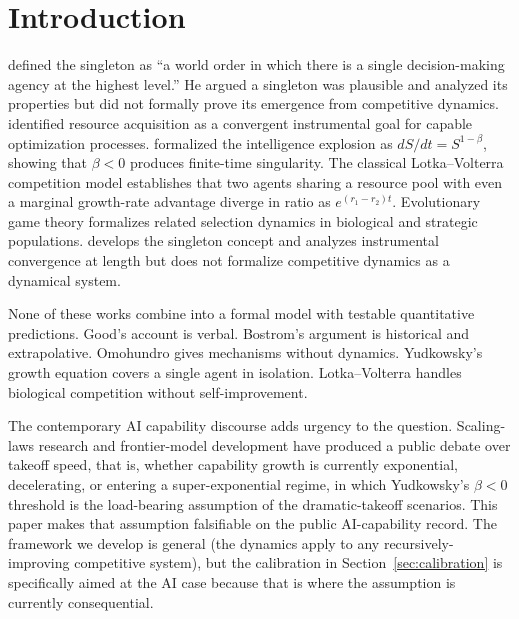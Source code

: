 \documentclass[11pt,letterpaper]{article}
\theoremstyle{plain}
\theoremstyle{definition}
\theoremstyle{remark}
\begin{document}
\section{Introduction}
\label{sec:intro}

\citet{bostrom2005singleton} defined the singleton as ``a world order in which
there is a single decision-making agency at the highest level.''
He argued a singleton was plausible and analyzed its properties but did not
formally prove its emergence from competitive dynamics.
\citet{omohundro2008basic} identified resource acquisition as a convergent
instrumental goal for capable optimization processes.
\citet{yudkowsky2013intelligence} formalized the intelligence explosion as
$dS/dt = S^{1-\beta}$, showing that $\beta < 0$ produces finite-time
singularity.
The classical Lotka--Volterra competition model
\citep{lotka1925elements,volterra1926fluctuations} establishes that two agents
sharing a resource pool with even a marginal growth-rate advantage diverge in
ratio as $e^{(r_1 - r_2)t}$.
Evolutionary game theory \citep{maynardsmith1982evolution,weibull1995evolutionary}
formalizes related selection dynamics in biological and strategic populations.
\citet{bostrom2014superintelligence} develops the singleton concept and
analyzes instrumental convergence at length but does not formalize competitive
dynamics as a dynamical system.

None of these works combine into a formal model with testable quantitative
predictions.
Good's \citeyearpar{good1965speculations} account is verbal.
Bostrom's argument is historical and extrapolative.
Omohundro gives mechanisms without dynamics.
Yudkowsky's growth equation covers a single agent in isolation.
Lotka--Volterra handles biological competition without self-improvement.

The contemporary AI capability discourse adds urgency to the question.
Scaling-laws research and frontier-model development have produced a
public debate over takeoff speed, that is, whether capability growth is currently
exponential, decelerating, or entering a super-exponential regime, in
which Yudkowsky's $\beta < 0$ threshold is the load-bearing assumption
of the dramatic-takeoff scenarios.
This paper makes that assumption falsifiable on the public AI-capability
record.
The framework we develop is general (the dynamics apply to any
recursively-improving competitive system), but the calibration in
Section~\ref{sec:calibration} is specifically aimed at the AI case
because that is where the assumption is currently consequential.
\end{document}
